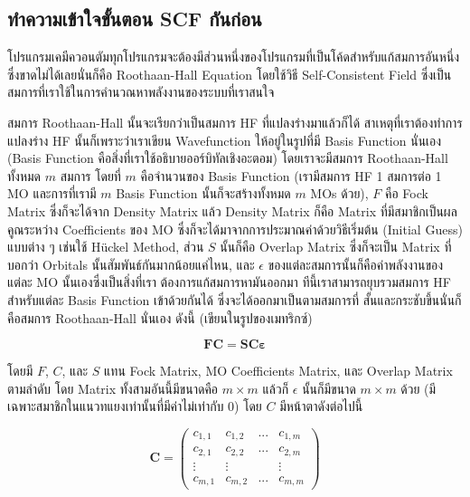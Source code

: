 \subsection{ทำความเข้าใจขั้นตอน SCF กันก่อน}

โปรแกรมเคมีควอนตัมทุกโปรแกรมจะต้องมีส่วนหนึ่งของโปรแกรมที่เป็นโค้ดสำหรับแก้สมการอันหนึ่งซึ่งขาดไม่ได้เลยนั่นก็คือ Roothaan-Hall
Equation โดยใช้วิธี Self-Consistent Field ซึ่งเป็นสมการที่เราใช้ในการคำนวณหาพลังงานของระบบที่เราสนใจ

สมการ Roothaan-Hall นั้นจะเรียกว่าเป็นสมการ HF ที่แปลงร่างมาแล้วก็ได้ สาเหตุที่เราต้องทำการแปลงร่าง HF นั้นก็เพราะว่าเราเขียน
Wavefunction ให้อยู่ในรูปที่มี Basis Function นั่นเอง (Basis Function คือสิ่งที่เราใช้อธิบายออร์บิทัลเชิงอะตอม) โดยเราจะมีสมการ
Roothaan-Hall ทั้งหมด $m$ สมการ โดยที่ $m$ คือจำนวนของ Basis Function (เรามีสมการ HF 1 สมการต่อ 1 MO และการที่เรามี
$m$ Basis Function นั้นก็จะสร้างทั้งหมด $m$ MOs ด้วย), $F$ คือ Fock Matrix ซึ่งก็จะได้จาก Density Matrix แล้ว
Density Matrix ก็คือ Matrix ที่มีสมาชิกเป็นผลคูณระหว่าง Coefficients ของ MO ซึ่งก็จะได้มาจากการประมาณค่าด้วยวิธีเริ่มต้น
(Initial Guess) แบบต่าง ๆ เช่นใช้ H\"{u}ckel Method, ส่วน $S$ นั้นก็คือ Overlap Matrix ซึ่งก็จะเป็น Matrix ที่บอกว่า
Orbitals นั้นสัมพันธ์กันมากน้อยแค่ไหน, และ $\epsilon$ ของแต่ละสมการนั้นก็คือค่าพลังงานของแต่ละ MO นั้นเองซึ่งเป็นสิ่งที่เรา%
ต้องการแก้สมการหามันออกมา ทีนี้เราสามารถยุบรวมสมการ HF สำหรับแต่ละ Basis Function เข้าด้วยกันได้ ซึ่งจะได้ออกมาเป็นตามสมการที่%
สั้นและกระชับขึ้นนั่นก็คือสมการ Roothaan-Hall นั่นเอง ดังนี้ (เขียนในรูปของเมทริกซ์)

\begin{equation}
  \bm{FC} = \bm{SC \varepsilon}
\end{equation}

โดยมี $F$, $C$, และ $S$ แทน Fock Matrix, MO Coefficients Matrix, และ Overlap Matrix ตามลำดับ โดย Matrix
ทั้งสามอันนี้มีขนาดคือ $m \times m$ แล้วก็ $\epsilon$ นั้นก็มีขนาด $m \times m$ ด้วย (มีเฉพาะสมาชิกในแนวทแยงเท่านั้นที่มีค่าไม่เท่ากับ 0)
โดย $C$ มีหน้าตาดังต่อไปนี้

\begin{equation}
  \bm{C}
  =
  \left( \begin{matrix} c_{1,1} & c_{1,2} & ... & c_{1,m} \\
               c_{2,1} & c_{2,2} & ... & c_{2,m} \\
               \vdots  & \vdots  &     & \vdots  \\
               c_{m,1} & c_{m,2} & ... & c_{m,m}
    \end{matrix} \right)
\end{equation}

